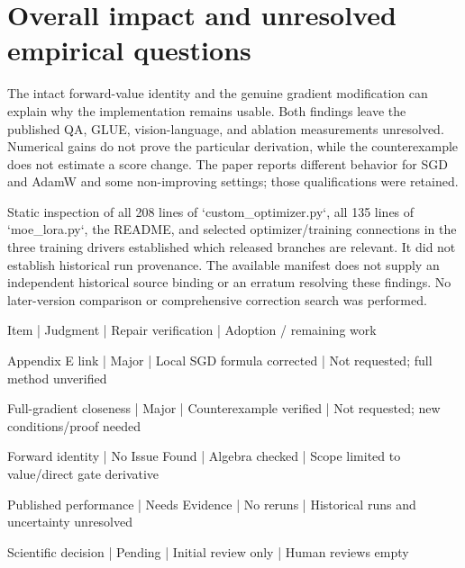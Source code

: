\documentclass[10pt]{article}
\begin{document}
\section*{Overall impact and unresolved empirical questions}
The intact forward-value identity and the genuine gradient modification can explain why the implementation remains usable. Both findings leave the published QA, GLUE, vision-language, and ablation measurements unresolved. Numerical gains do not prove the particular derivation, while the counterexample does not estimate a score change. The paper reports different behavior for SGD and AdamW and some non-improving settings; those qualifications were retained.\par
Static inspection of all 208 lines of `custom\_optimizer.py`, all 135 lines of `moe\_lora.py`, the README, and selected optimizer/training connections in the three training drivers established which released branches are relevant. It did not establish historical run provenance. The available manifest does not supply an independent historical source binding or an erratum resolving these findings. No later-version comparison or comprehensive correction search was performed.\par
Item | Judgment | Repair verification | Adoption / remaining work\par
Appendix E link | Major | Local SGD formula corrected | Not requested; full method unverified\par
Full-gradient closeness | Major | Counterexample verified | Not requested; new conditions/proof needed\par
Forward identity | No Issue Found | Algebra checked | Scope limited to value/direct gate derivative\par
Published performance | Needs Evidence | No reruns | Historical runs and uncertainty unresolved\par
Scientific decision | Pending | Initial review only | Human reviews empty\par
\end{document}

